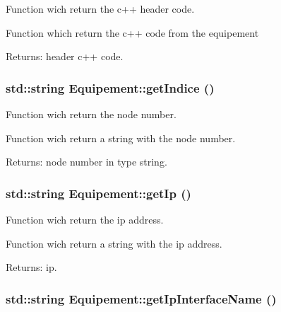 Function wich return the c++ header code. 

Function which return the c++ code from the equipement

\begin{Desc}
\item[Returns:]header c++ code. \end{Desc}
\hypertarget{class_equipement_6074ba51d63aaeebe8293a9ba9fde31f}{
\subsubsection[{getIndice}]{\setlength{\rightskip}{0pt plus 5cm}std::string Equipement::getIndice ()}}
\label{class_equipement_6074ba51d63aaeebe8293a9ba9fde31f}


Function wich return the node number. 

Function wich return a string with the node number.

\begin{Desc}
\item[Returns:]node number in type string. \end{Desc}
\hypertarget{class_equipement_4a0b3805228532e39dcb5f83bb2d6eac}{
\subsubsection[{getIp}]{\setlength{\rightskip}{0pt plus 5cm}std::string Equipement::getIp ()}}
\label{class_equipement_4a0b3805228532e39dcb5f83bb2d6eac}


Function wich return the ip address. 

Function wich return a string with the ip address.

\begin{Desc}
\item[Returns:]ip. \end{Desc}
\hypertarget{class_equipement_a603e0547ea7c1b7f10757226100e1cc}{
\subsubsection[{getIpInterfaceName}]{\setlength{\rightskip}{0pt plus 5cm}std::string Equipement::getIpInterfaceName ()}}
\label{class_equipement_a603e0547ea7c1b7f10757226100e1cc}


